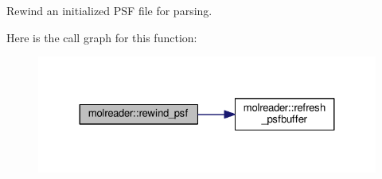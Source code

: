 Rewind an initialized P\+S\+F file for parsing. 



Here is the call graph for this function\+:\nopagebreak
\begin{figure}[H]
\begin{center}
\leavevmode
\includegraphics[width=324pt]{classmolreader_a6d79c8d97fd91cfb25dec2b67320c77b_cgraph}
\end{center}
\end{figure}




